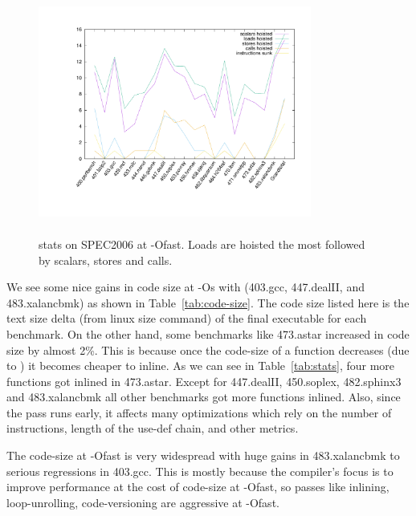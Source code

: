 \documentclass[sigplan,10pt,review,anonymous]{acmart}\settopmatter{printfolios=true,printccs=false,printacmref=false}
\begin{document}
\begin{figure}[h!]
  \includegraphics[width=0.8\textwidth,height=8cm]{gcm-stats.pdf}
  \vspace*{-1.5cm}
\caption{\GCM{} stats on SPEC2006 at -Ofast. Loads are hoisted the most followed
  by scalars, stores and calls.}
\label{tab:code-motion-metric}
\end{figure}

We see some nice gains in code size at -Os with \gcm{} (403.gcc, 447.dealII, and
483.xalancbmk) as shown in Table~\ref{tab:code-size}.  The code size listed here
is the text size delta (from linux size command) of the final executable for
each benchmark.  On the other hand, some benchmarks like 473.astar increased in
code size by almost 2\%. This is because once the code-size of a function
decreases (due to \GCM{}) it becomes cheaper to inline. As we can see in
Table~\ref{tab:stats}, four more functions got inlined in 473.astar. Except for
447.dealII, 450.soplex, 482.sphinx3 and 483.xalancbmk all other benchmarks got
more functions inlined. Also, since the pass runs early, it affects many
optimizations which rely on the number of instructions, length of the use-def
chain, and other metrics.

The code-size at -Ofast is very widespread with huge gains in 483.xalancbmk to
serious regressions in 403.gcc. This is mostly because the compiler's focus is
to improve performance at the cost of code-size at -Ofast, so passes like
inlining, loop-unrolling, code-versioning are aggressive at -Ofast.
\end{document}
